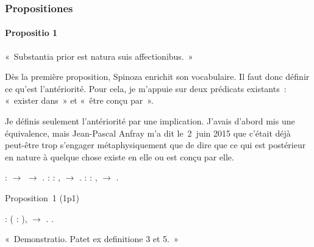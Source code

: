 \documentclass[12pt]{report}
\begin{document}
\subsubsection{Propositiones}



\paragraph{Propositio 1}

 « Substantia prior est natura suis affectionibus. » 

 Dès la première proposition, Spinoza enrichit son vocabulaire. Il
  faut donc définir ce qu'est l'antériorité. Pour cela, je m'appuie sur
  deux prédicats existants : « exister dans » et « être conçu par ». 


  Je définis seulement l'antériorité par une implication. J'avais
  d'abord mis une équivalence, mais Jean-Pascal Anfray m'a dit le 2 juin
  2015 que c'était déjà peut-être trop s'engager métaphysiquement que de
  dire que ce qui est postérieur en nature à quelque chose existe en
  elle ou est conçu par elle. \begin{coqdoccode}
\coqdocemptyline
\coqdocindent{1.00em}
 :  \ensuremath{\rightarrow}  \ensuremath{\rightarrow} .\coqdoceol
\coqdocemptyline
\coqdocindent{1.00em}
 :\coqdoceol
\coqdocindent{2.00em}
\coqdockw{\ensuremath{\forall}}  : ,    \ensuremath{\rightarrow}   .\coqdoceol
\coqdocemptyline
\coqdocindent{1.00em}
 :\coqdoceol
\coqdocindent{2.00em}
\coqdockw{\ensuremath{\forall}}  : ,    \ensuremath{\rightarrow}   .\coqdoceol
\coqdocemptyline
\end{coqdoccode}
Proposition 1 (1p1) \begin{coqdoccode}
\coqdocindent{1.00em}
 :\coqdoceol
\coqdocindent{2.00em}
\coqdockw{\ensuremath{\forall}} ( : ),    \ensuremath{\rightarrow}   .\coqdoceol
\coqdocemptyline
\coqdocindent{1.00em}
.\coqdoceol
\end{coqdoccode}
« Demonstratio. Patet ex definitione 3 et 5. » 
\end{document}
